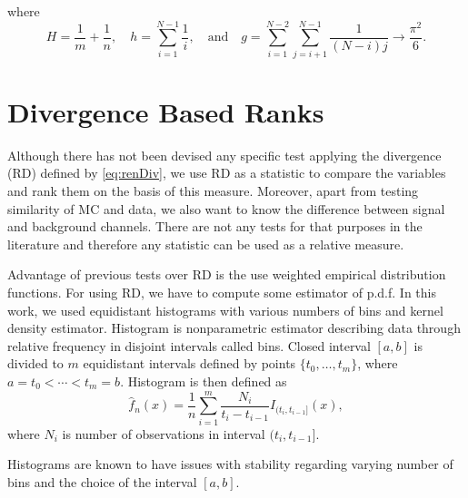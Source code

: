 where
\begin{equation}
H = \frac{1}{m}+\frac{1}{n},\quad	h = \sum_{i=1}^{N-1}\frac{1}{i},\quad \mathrm{ and } \quad g = \sum_{i=1}^{N-2}\sum_{j=i+1}^{N-1}\frac{1}{(N-i)j}\rightarrow \frac{\pi^2}{6}.
\end{equation}

\section{\ren Divergence Based Ranks}
Although there has not been devised any specific test applying the \ren divergence (RD)  defined by \eqref{eq:renDiv}, we use RD as a statistic to compare the variables and rank them on the basis of this measure. %
Moreover, apart from testing similarity of MC and data, we also want to know the difference between signal and background channels. There are not any tests for that purposes in the literature and therefore any statistic can be used as a relative measure. 

Advantage of previous tests over RD is the use weighted empirical distribution functions. For using RD, we have to compute some estimator of p.d.f. In this work, we used equidistant histograms with various numbers of bins and kernel density estimator. Histogram is nonparametric estimator describing data through relative frequency in disjoint intervals called bins. Closed interval $[a,b]$ is divided to $m$ equidistant intervals defined by points $\lbrace t_0, \ldots, t_m \rbrace$, where $a = t_0 < \cdots < t_m = b.$ Histogram is then defined as 
\begin{equation}
\hat{f}_n(x) = \frac{1}{n} \sum_{i=1}^m \frac{N_i}{t_i - t_{i-1}} I_{(t_i, t_{i-1}]}(x),
\end{equation}
where $N_i$ is number of observations in interval $(t_i, t_{i-1}]$. 

Histograms are known to have issues with stability regarding varying number of bins and  the choice of the interval $[a,b]$.

